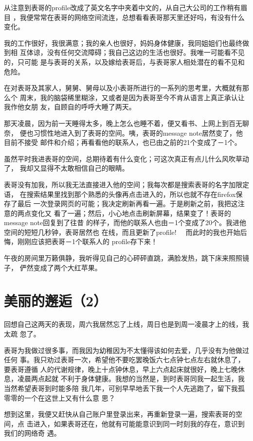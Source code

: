 \documentclass[12pt]{book}
\begin{document}
从注意到表哥的profile改成了英文名字中夹着中文的，从自己大公司的工作稍有眉目
，我便常常在表哥的网络空间流连，总想看看表哥那天里还好吗，有没有什么变化。

我的工作很好，我很满意；我的亲人也很好，妈妈身体健康，我同姐姐们也最终做到相
互体谅，没有任何交流障碍；我自己这边的生活也很好。我唯一可能看不见的，只可能
是与表哥的关系，以及嫁给表哥后，与表哥家人相处潜在的看不见和危险。

在对表哥及其家人，舅舅、舅母以及小表哥所进行的一系列的思考里，大概就有那么个
周末，我的脑袋稀里糊涂，又或者是因为表哥至今不肯从语言上真正承认让我作他女朋
友，自顾自的呼呼大睡了两天。

那天凌晨，因为前一天睡得太多，晚上怎么也睡不着，便又看书、上网上到百无聊奈，
便也习惯性地进入到了表哥的空间。咦，表哥的message note居然变了，他目前不接受
邮件和介绍；再看看他的联系人，也已由之前的21个变成了－1个。

虽然平时我进表哥的空间，总期待着有什么变化；可这次真正有点儿什么风吹草动了，
我却又显得不太敢相信自己的眼睛。

表哥没有加我，所以我无法直接进入他的空间；我每次都是搜索表哥的名字加限定语，
在搜索结果里找到那个熟悉的头像再点击进入的，所以也就不存在firefox保存了最后
一次登录网页的可能；我决定刷新再看一遍。于是刷新之前，我把这注意的两点变化又
看了一遍；然后，小心地点击刷新屏幕，结果变了！表哥的message note回复到了往昔
的样子，而他的联系人也由－1个变成了20个。我进他空间的短短几秒钟，表哥居然也
在线，而且更新了profile!　 而此时的我也开始后悔，刚刚应该把表哥－1个联系人的
profile存下来！

午夜的房间里万籁俱静，我听得见自己的心砰砰直跳，满脸发热，跳下床来照照镜子，
俨然变成了两个大红苹果。
\section{美丽的邂逅（2）}
\label{sec-9-63}

回想自己这两天的表现，周六我居然忘了上线，周日也是到周一凌晨才上的线，我太疏
忽了。

表哥为我做过很多事，而我因为幼稚因为不太懂得该如何去爱，几乎没有为他做过任何
事。我只劝过表哥一次，希望他不要吃罢晚饭六七点钟七点左右就休息了，要表哥遵循
人的代谢规律，晚上十点钟休息，早上六点起床就很好，晚上七晚休息，凌晨两点起就
不利于身体健康。我想的当然是，到时表哥同我一起生活，我当然希望表哥到时能多陪
我几年，可别早早地丢下我一个人先逃跑了，留下我孤零零的一个在这世上又有什么意
思？

想到这里，我便又赶快从自己账户里登录出来，再重新登录一遍，搜索表哥的空间，点
击进入，如果表哥还在，他就有可能能意识到同一时刻我的存在，意识到我们的网络奇
遇。
\end{document}
